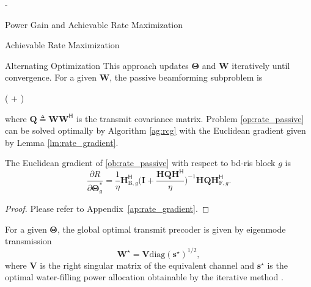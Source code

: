 \begin{section}{-}
\begin{subsection}{Power Gain and Achievable Rate Maximization}
\begin{subsubsection}{Achievable Rate Maximization}
			\begin{paragraph}{Alternating Optimization}
				This approach updates $\mathbf{\Theta}$ and $\mathbf{W}$ iteratively until convergence.
				For a given $\mathbf{W}$, the passive beamforming subproblem is
				\begin{maxi!}
					{\scriptstyle{\mathbf{\Theta}}}{\log \det \biggl( + \biggr)}{\label{op:rate_passive}}{\label{ob:rate_passive}}
				\end{maxi!}
				where $\mathbf{Q} \triangleq \mathbf{W} \mathbf{W}^\mathsf{H}$ is the transmit covariance matrix.
				Problem \eqref{op:rate_passive} can be solved optimally by Algorithm \ref{ag:rcg} with the Euclidean gradient given by Lemma \ref{lm:rate_gradient}.
				\begin{lemma}\label{lm:rate_gradient}
					The Euclidean gradient of \eqref{ob:rate_passive} with respect to \gls{bd}-\gls{ris} block $g$ is
					\begin{equation}
						\frac{\partial R}{\partial \mathbf{\Theta}_g^*} = \frac{1}{\eta} \mathbf{H}_{\mathrm{B},g}^\mathsf{H} \biggl(\mathbf{I} + \frac{\mathbf{H}\mathbf{Q}\mathbf{H}^\mathsf{H}}{\eta}\biggr)^{-1} \mathbf{H} \mathbf{Q} \mathbf{H}_{\mathrm{F},g}^\mathsf{H}.
						\label{eq:rate_gradient}
					\end{equation}
				\end{lemma}

				\begin{proof}
					Please refer to Appendix~\ref{ap:rate_gradient}.
				\end{proof}
				For a given $\mathbf{\Theta}$, the global optimal transmit precoder is given by eigenmode transmission \cite{Clerckx2013}
				\begin{equation}
					\mathbf{W}^\star = \mathbf{V} {\mathrm{diag}(\mathbf{s}^\star)}^{1/2},
					\label{eq:precoder_eigenmode}
				\end{equation}
				where $\mathbf{V}$ is the right singular matrix of the equivalent channel and $\mathbf{s}^\star$ is the optimal water-filling power allocation obtainable by the iterative method \cite{Tse2005}.


\end{paragraph}
\end{subsubsection}
\end{subsection}
\end{section}
